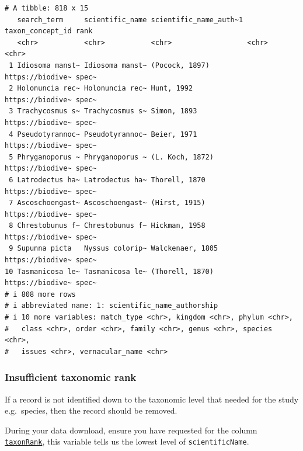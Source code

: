 \documentclass[
  letterpaper,
  DIV=11,
  numbers=noendperiod,
  oneside]{scrreprt}
\begin{document}
\begin{verbatim}
# A tibble: 818 x 15
   search_term     scientific_name scientific_name_auth~1 taxon_concept_id rank 
   <chr>           <chr>           <chr>                  <chr>            <chr>
 1 Idiosoma manst~ Idiosoma manst~ (Pocock, 1897)         https://biodive~ spec~
 2 Holonuncia rec~ Holonuncia rec~ Hunt, 1992             https://biodive~ spec~
 3 Trachycosmus s~ Trachycosmus s~ Simon, 1893            https://biodive~ spec~
 4 Pseudotyrannoc~ Pseudotyrannoc~ Beier, 1971            https://biodive~ spec~
 5 Phryganoporus ~ Phryganoporus ~ (L. Koch, 1872)        https://biodive~ spec~
 6 Latrodectus ha~ Latrodectus ha~ Thorell, 1870          https://biodive~ spec~
 7 Ascoschoengast~ Ascoschoengast~ (Hirst, 1915)          https://biodive~ spec~
 8 Chrestobunus f~ Chrestobunus f~ Hickman, 1958          https://biodive~ spec~
 9 Supunna picta   Nyssus colorip~ Walckenaer, 1805       https://biodive~ spec~
10 Tasmanicosa le~ Tasmanicosa le~ (Thorell, 1870)        https://biodive~ spec~
# i 808 more rows
# i abbreviated name: 1: scientific_name_authorship
# i 10 more variables: match_type <chr>, kingdom <chr>, phylum <chr>,
#   class <chr>, order <chr>, family <chr>, genus <chr>, species <chr>,
#   issues <chr>, vernacular_name <chr>
\end{verbatim}

\hypertarget{insufficient-taxonomic-rank}{%
\subsubsection*{Insufficient taxonomic
rank}\label{insufficient-taxonomic-rank}}

If a record is not identified down to the taxonomic level that needed
for the study e.g.~species, then the record should be removed.

During your data download, ensure you have requested for the column
\href{https://dwc.tdwg.org/terms/\#dwc:taxonRank}{\texttt{taxonRank}},
this variable tells us the lowest level of \texttt{scientificName}.
\end{document}
